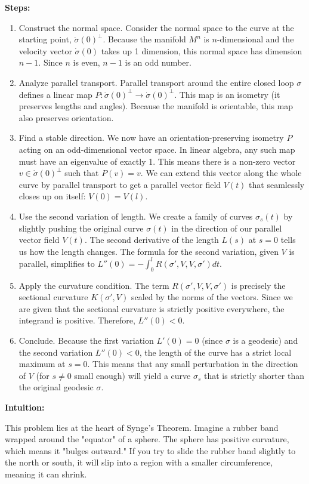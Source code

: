 \begin{solution}
\textbf{Steps:}
\begin{enumerate}
    \item Construct the normal space. Consider the normal space to the curve at the starting point, $\dot{\sigma}(0)^\perp$. Because the manifold $M^n$ is $n$-dimensional and the velocity vector $\dot{\sigma}(0)$ takes up 1 dimension, this normal space has dimension $n-1$. Since $n$ is even, $n-1$ is an odd number.
    \item Analyze parallel transport. Parallel transport around the entire closed loop $\sigma$ defines a linear map $P : \dot{\sigma}(0)^\perp \to \dot{\sigma}(0)^\perp$. This map is an isometry (it preserves lengths and angles). Because the manifold is orientable, this map also preserves orientation.
    \item Find a stable direction. We now have an orientation-preserving isometry $P$ acting on an odd-dimensional vector space. In linear algebra, any such map must have an eigenvalue of exactly 1. This means there is a non-zero vector $v \in \dot{\sigma}(0)^\perp$ such that $P(v) = v$. We can extend this vector along the whole curve by parallel transport to get a parallel vector field $V(t)$ that seamlessly closes up on itself: $V(0) = V(l)$.
    \item Use the second variation of length. We create a family of curves $\sigma_s(t)$ by slightly pushing the original curve $\sigma(t)$ in the direction of our parallel vector field $V(t)$. The second derivative of the length $L(s)$ at $s=0$ tells us how the length changes. The formula for the second variation, given $V$ is parallel, simplifies to $L''(0) = -\int_0^l R(\sigma', V, V, \sigma') dt$.
    \item Apply the curvature condition. The term $R(\sigma', V, V, \sigma')$ is precisely the sectional curvature $K(\sigma', V)$ scaled by the norms of the vectors. Since we are given that the sectional curvature is strictly positive everywhere, the integrand is positive. Therefore, $L''(0) < 0$.
    \item Conclude. Because the first variation $L'(0) = 0$ (since $\sigma$ is a geodesic) and the second variation $L''(0) < 0$, the length of the curve has a strict local maximum at $s=0$. This means that any small perturbation in the direction of $V$ (for $s \neq 0$ small enough) will yield a curve $\sigma_s$ that is strictly shorter than the original geodesic $\sigma$.
\end{enumerate}
\textbf{Intuition:}

This problem lies at the heart of Synge's Theorem. Imagine a rubber band wrapped around the "equator" of a sphere. The sphere has positive curvature, which means it "bulges outward." If you try to slide the rubber band slightly to the north or south, it will slip into a region with a smaller circumference, meaning it can shrink. 


\end{solution}
